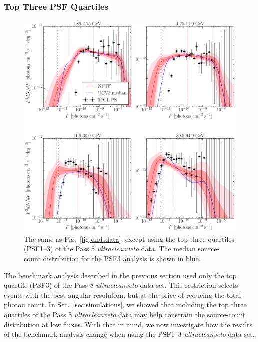\subsubsection{Top Three PSF Quartiles}
\label{sec:benchmark_top3}
\begin{figure}[phtb] %
   \centering
   \includegraphics[width=\textwidth]{ch-igrb/plots/U3RRBlw1p8-1-SourceCounts-final-700-E15-p8-3br.pdf} 
   \caption{The same as Fig.~\ref{fig:dndsdata}, except using the top three quartiles (PSF1--3) of the Pass 8 {\it ultracleanveto} data.  The median source-count distribution for the PSF3 analysis is shown in blue.  %
   }
   \label{fig:dndsdata_top3}
\end{figure}

The benchmark analysis described in the previous section used only the top quartile (PSF3) of the Pass 8 {\it ultracleanveto} data set.  This restriction selects events with the best angular resolution, but at the price of reducing the total photon count.  In Sec.~\ref{sec:simulations}, we showed that  including the top three quartiles of the Pass 8 {\it ultracleanveto} data may help constrain the source-count distribution at low fluxes.  With that in mind, we now investigate how the results of the benchmark analysis change when using the PSF1--3 {\it ultracleanveto} data set.

